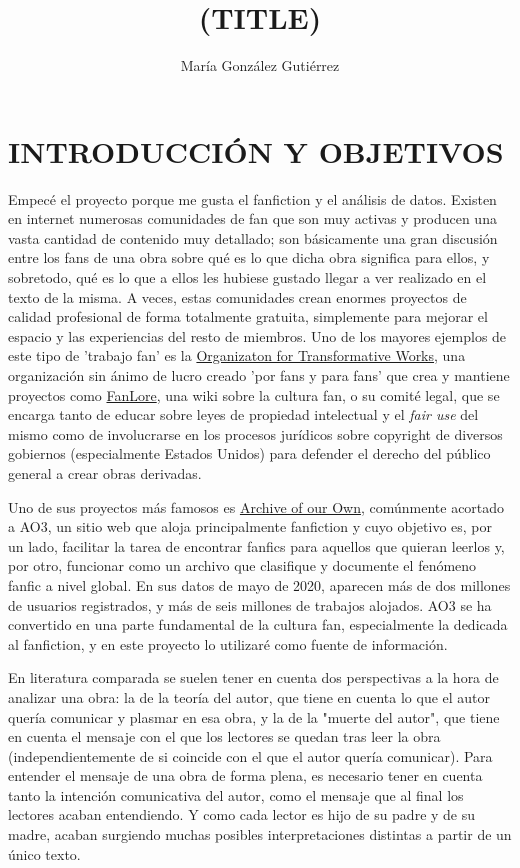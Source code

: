 \documentclass{pre-tfg}
\title{(TITLE)}
\author{María González Gutiérrez}
\begin{document}
\maketitle
\tableofcontents

\newpage


\section{INTRODUCCIÓN Y OBJETIVOS}

Empecé el proyecto porque me gusta el fanfiction y el análisis de datos. Existen en internet numerosas comunidades de fan que son muy activas y producen una vasta cantidad de contenido muy detallado; son básicamente una gran discusión entre los fans de una obra sobre qué es lo que dicha obra significa para ellos, y sobretodo, qué es lo que a ellos les hubiese gustado llegar a ver realizado en el texto de la misma. A veces, estas comunidades crean enormes proyectos de calidad profesional de forma totalmente gratuita, simplemente para mejorar el espacio y las experiencias del resto de miembros. Uno de los mayores ejemplos de este tipo de 'trabajo fan' es la \href{https://www.transformativeworks.org/}{Organizaton for Transformative Works}, una organización sin ánimo de lucro creado 'por fans y para fans' que crea y mantiene proyectos como \href{https://fanlore.org/wiki/Main_Page}{FanLore}, una wiki sobre la cultura fan, o su comité legal, que se encarga tanto de educar sobre leyes de propiedad intelectual y el \textit{fair use} del mismo como de involucrarse en los procesos jurídicos sobre copyright de diversos gobiernos (especialmente Estados Unidos) para defender el derecho del público general a crear obras derivadas.

Uno de sus proyectos más famosos es \href{https://archiveofourown.org/}{Archive of our Own}, comúnmente acortado a AO3, un sitio web que aloja principalmente fanfiction y cuyo objetivo es, por un lado, facilitar la tarea de encontrar fanfics para aquellos que quieran leerlos y, por otro, funcionar como un archivo que clasifique y documente el fenómeno fanfic a nivel global. En sus datos de mayo de 2020, aparecen más de dos millones de usuarios registrados, y más de seis millones de trabajos alojados. AO3 se ha convertido en una parte fundamental de la cultura fan, especialmente la dedicada al fanfiction, y en este proyecto lo utilizaré como fuente de información.


En literatura comparada se suelen tener en cuenta dos perspectivas a la hora de analizar una obra: la de la teoría del autor, que tiene en cuenta lo que el autor quería comunicar y plasmar en esa obra, y la de la "muerte del autor"\cite{Barthes}, que tiene en cuenta el mensaje con el que los lectores se quedan tras leer la obra (independientemente de si coincide con el que el autor quería comunicar).
Para entender el mensaje de una obra de forma plena\cite{ellis_2018}, es necesario tener en cuenta tanto la intención comunicativa del autor, como el mensaje que al final los lectores acaban entendiendo. Y como cada lector es hijo de su padre y de su madre, acaban surgiendo muchas posibles interpretaciones distintas a partir de un único texto.
\end{document}
